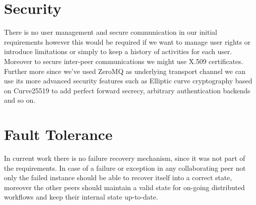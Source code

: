 \section{Security}
There is no user management and secure communication in our initial requirements however this would be required if we want to manage user
rights or introduce limitations or simply to keep a history of activities for each user. Moreover to secure inter-peer communications 
we might use X.509 certificates. Further more since we've used ZeroMQ\cite{ZeroMQ} as underlying transport channel we can use its more advanced
security features such as Elliptic curve cryptography\cite{Curve} based on Curve25519\cite{Curve25519} to add perfect forward secrecy, 
arbitrary authentication backends and so on.

\section{Fault Tolerance}
In current work there is no failure recovery mechanism, since it was not part of the requirements. In case of a failure or exception in any 
collaborating peer not only the failed instance should be able to recover itself into a correct state, moreover the other peers should maintain
a valid state for on-going distributed workflows and keep their internal state up-to-date.